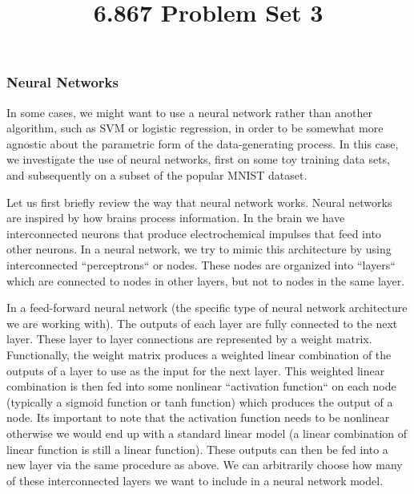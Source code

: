 \documentclass[10pt]{article}
\begin{document}
	\title{6.867 Problem Set 3}
	\maketitle
	
\subsubsection*{Neural Networks}

In some cases, we might want to use a neural network rather than another algorithm, such as SVM or logistic regression, in order to be somewhat more agnostic about the parametric form of the data-generating process. In this case, we investigate the use of neural networks, first on some toy training data sets, and subsequently on a subset of the popular MNIST dataset.

Let us first briefly review the way that neural network works. Neural networks are inspired by how brains process information. In the brain we have interconnected neurons that produce electrochemical impulses that feed into other neurons. In a neural network, we try to mimic this architecture by using interconnected ``perceptrons`` or nodes. These nodes are organized into ``layers`` which are connected to nodes in other layers, but not to nodes in the same layer. 

In a feed-forward neural network (the specific type of neural network architecture we are working with). The outputs of each layer are fully connected to the next layer. These layer to layer connections are represented by a weight matrix. Functionally, the weight matrix produces a weighted linear combination of the outputs of a layer to use as the input for the next layer. This weighted linear combination is then fed into some nonlinear ``activation function`` on each node (typically a sigmoid function or tanh function) which produces the output of a node. Its important to note that the activation function needs to be nonlinear otherwise we would end up with a standard linear model (a linear combination of linear function is still a linear function). These outputs can then be fed into a new layer via the same procedure as above. We can arbitrarily choose how many of these interconnected layers we want to include in a neural network model. 
\end{document}
